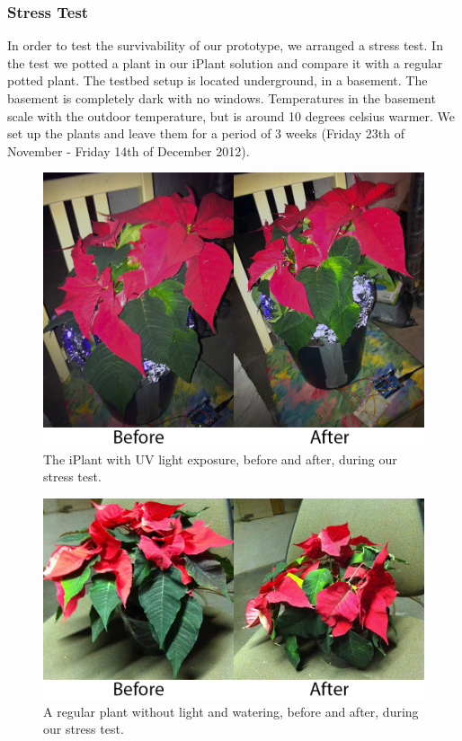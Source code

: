 \documentclass{ubicomp2012}
\begin{document}
\subsubsection{Stress Test}
In order to test the survivability of our prototype, we arranged a stress test. In the test we potted a plant in our iPlant solution and compare it with a regular potted plant. 
The testbed setup is located underground, in a basement. The basement is completely dark with no windows. Temperatures in the basement scale with the outdoor temperature, but is around 10 degrees celsius warmer. We set up the plants and leave them for a period of 3 weeks (Friday 23th of November - Friday 14th of December 2012).

\begin{figure}[h!]
\centering
\includegraphics[width=\columnwidth]{good_plant.png}
\caption{The iPlant with UV light exposure, before and after, during our stress test.}
\label{fig:good_plant}
\end{figure}

\begin{figure}[h!]
\centering
\includegraphics[width=\columnwidth]{bad_plant.png}
\caption{A regular plant without light and watering, before and after, during our stress test.}
\label{fig:bad_plant}
\end{figure}
\end{document}

